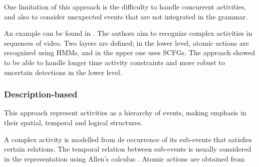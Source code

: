 \documentclass[a4paper, 12pt, openany, oneside]{book}
\begin{document}
One limitation of this approach is the difficulty to handle concurrent activities, and also to consider unexpected events that are not integrated in the grammar.

An example can be found in \citep{Ivanov2000_RecVisActSCFG}.
The authors aim to recognize complex activities in sequences of video.
Two layers are defined; in the lower level, atomic actions are recognized using HMMs, and in the upper one uses SCFGs.
The approach showed to be able to handle longer time activity constraints and more robust to uncertain detections in the lower level.


\subsubsection{Description-based}
This approach represent activities as a hierarchy of events, making emphasis in their spatial, temporal and logical structures.

A complex activity is modelled from de occurrence of its sub-events that satisfies certain relations.
The temporal relation between sub-events is usually considered in the representation using Allen's calculus \citep{Allen83_MaintainingKnowledgeTemporal}.
Atomic actions are obtained from









% 
\end{document}
